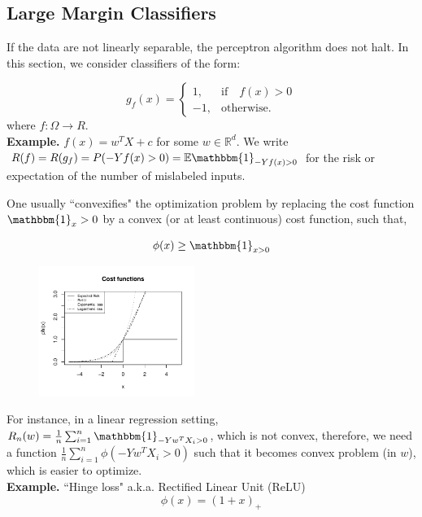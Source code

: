 \documentclass[11pt, english]{article}
\begin{document}
\subsection{Large Margin Classifiers}
 
If the data are not linearly separable, the perceptron algorithm does not halt. In this section, we consider classifiers of the form:
 
\begin{equation}
	g_f(x)=\begin{cases}
	1, & \text{if} \quad f(x) > 0\\
	-1, & \text{otherwise}.
	\end{cases}
\end{equation}
where $f:\Omega \rightarrow R$.\\
\textbf{Example.} $f(x) = w^TX+c$ for some $w \in \mathbb{R}^d$.
We write $R(f) = R(g_f) = P(-Yf(x)>0) = \mathbb{E}\mathbbm{1}_{-Yf(x)>0}$ for the risk or expectation of the number of mislabeled inputs. 
 
One usually ``convexifies" the optimization problem by replacing the cost function $\mathbbm{1}_x>0$ by a convex (or at least continuous) cost function, such that, 
 
\begin{equation}
\phi(x) \geq \mathbbm{1}_{x>0} 
\end{equation}
 
 
\begin{figure}
 	\centering
 	\includegraphics[width=0.45\textwidth]{cost_functions.pdf}
\end{figure}
 
For instance, in a linear regression setting, $R_n(w) = \frac{1}{n} \sum_{i=1}^{n} \mathbbm{1}_{-Yw^TX_i>0}$, which is not convex, therefore, we need a function $\frac{1}{n} \sum_{i=1}^{n} \phi(-Yw^TX_i>0)$ such that it becomes convex problem (in $w$), which is easier to optimize.\\ %
 
\textbf{Example.} ``Hinge loss" a.k.a. Rectified Linear Unit (ReLU)\\
\begin{equation} 
\phi(x) = (1+x)_+
\end{equation}
\end{document}
